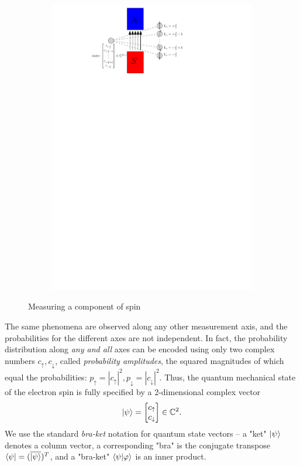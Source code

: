 \documentclass[final,3p,mathptmx]{elsarticle}
\begin{document}
\begin{figure}[h]
\begin{subfigure}{0.48\textwidth}
		\includegraphics[width=\textwidth, keepaspectratio]{figures/spin_anim_08.pdf}
		\label{fig:spind2}
	\end{subfigure}
	\caption{Measuring a component of spin}
\end{figure}

The same phenomena are observed along any other measurement axis, and the probabilities for the different axes are not independent. In fact, the probability distribution along \emph{any and all} axes can be encoded using only two complex numbers $c_{\uparrow}, c_{\downarrow}$, called \emph{probability amplitudes}, the squared magnitudes of which equal the probabilities: $p_{\uparrow} = \left| c_{\uparrow} \right|^{2}, p_{\downarrow} = \left| c_{\downarrow} \right|^{2}$. Thus, the quantum mechanical state of the electron spin is fully specified by a 2-dimensional complex vector
\begin{align}
\ket{\psi} = \begin{bmatrix}
c_{\uparrow} \\
c_{\downarrow}
\end{bmatrix} \in \mathbb{C}^{2}.
\end{align}
We use the standard \emph{bra-ket} notation for quantum state vectors -- a "ket" $\ket{\psi}$ denotes a column vector, a corresponding "bra" is the conjugate transpose $\bra{\psi} = (\overline{\ket{\psi}})^{T}$, and a "bra-ket" $\braket{\psi|\varphi}$ is an inner product.
\end{document}
